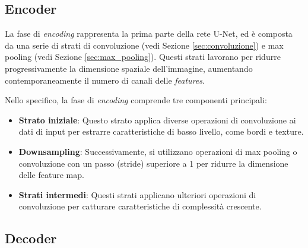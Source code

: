 \subsection{Encoder}
\label{sec:Encoder}

La fase di \textit{encoding} rappresenta la prima parte della rete U-Net, ed è composta da una serie
di strati di convoluzione (vedi Sezione \ref{sec:convoluzione}) e max pooling (vedi Sezione
\ref{sec:max_pooling}). Questi strati lavorano per ridurre progressivamente la dimensione spaziale
dell'immagine, aumentando contemporaneamente il numero di canali delle \textit{features}.

Nello specifico, la fase di \textit{encoding} comprende tre componenti principali:
\begin{itemize}
	\item \textbf{Strato iniziale}: Questo strato applica diverse operazioni di convoluzione ai dati
	      di input per estrarre caratteristiche di basso livello, come bordi e texture.
	\item \textbf{Downsampling}: Successivamente, si utilizzano operazioni di max pooling o
	      convoluzione con un passo (stride) superiore a 1 per ridurre la dimensione delle feature map.
	\item \textbf{Strati intermedi}: Questi strati applicano ulteriori operazioni di convoluzione per
	      catturare caratteristiche di complessità crescente.
\end{itemize}


\subsection{Decoder}
\label{sec:Decoder}


